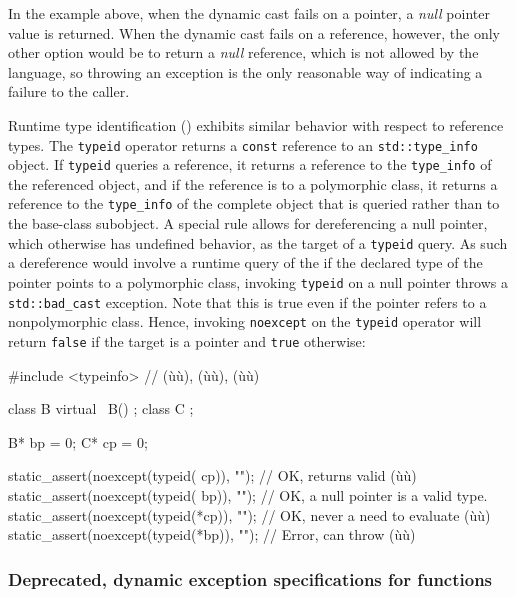 \noindent In the example above, when the dynamic cast fails on a pointer, a
\emph{null} pointer value is returned. When the dynamic cast fails on a
reference, however, the only other option would be to return a
\emph{null} reference, which is not allowed by the language, so throwing
an exception is the only reasonable way of indicating a failure to the
caller.

Runtime type identification () exhibits similar behavior
with respect to reference types. The \lstinline!typeid! operator returns a
\lstinline!const!  reference to an \lstinline!std::type_info!
object. If \lstinline!typeid! queries a reference, it returns a reference
to the \lstinline!type_info! of the referenced object, and if the
reference is to a polymorphic class, it returns a reference to the
\lstinline!type_info! of the complete object that is queried rather than
to the base-class subobject. A special rule allows for dereferencing a
null pointer, which otherwise has undefined behavior, as the target of a
\lstinline!typeid! query. As such a dereference would involve a runtime
query of the  if the declared type of the pointer points
to a polymorphic class, invoking \lstinline!typeid! on a null pointer
throws a \lstinline!std::bad_cast! exception. Note that this is true even
if the pointer refers to a nonpolymorphic class. Hence, invoking
\lstinline!noexcept! on the \lstinline!typeid! operator will return
\lstinline!false! if the target is a pointer and \lstinline!true! otherwise:

\begin{emcppslisting}
#include <typeinfo>  // (ù{}ù), (ù{}ù), (ù{}ù)

class B { virtual ~B() { } };
class C { };

B* bp = 0;
C* cp = 0;

static_assert(noexcept(typeid( cp)), "");  // OK, returns valid (ù{}ù)
static_assert(noexcept(typeid( bp)), "");  // OK, a null pointer is a valid type.
static_assert(noexcept(typeid(*cp)), "");  // OK, never a need to evaluate (ù{}ù)
static_assert(noexcept(typeid(*bp)), "");  // Error, can throw (ù{}ù)
\end{emcppslisting}
    

\subsubsection[Deprecated, dynamic exception specifications for functions]{Deprecated, dynamic exception specifications for functions}\label{deprecated,-dynamic-exception-specifications-for-functions}

